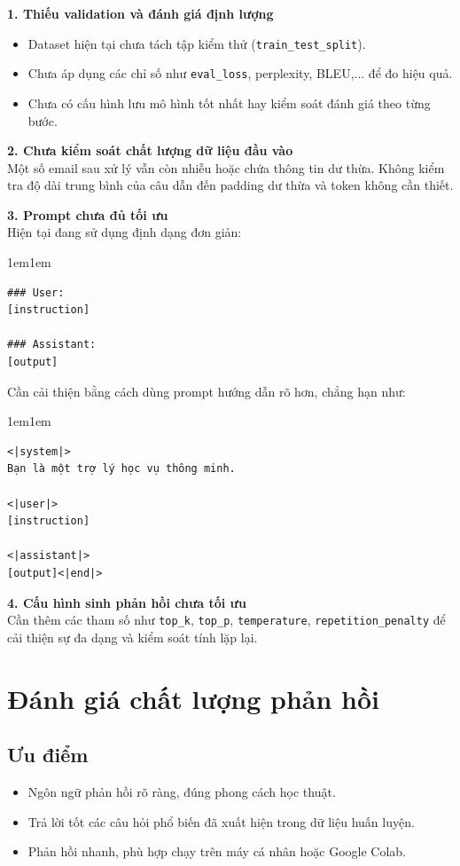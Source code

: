 \documentclass[../DoAn.tex]{subfiles}
\begin{document}
\textbf{1. Thiếu validation và đánh giá định lượng} \\ 
\begin{itemize}
    \item Dataset hiện tại chưa tách tập kiểm thử (\texttt{train\_test\_split}).
    \item Chưa áp dụng các chỉ số như \texttt{eval\_loss}, perplexity, BLEU,... để đo hiệu quả.
    \item Chưa có cấu hình lưu mô hình tốt nhất hay kiểm soát đánh giá theo từng bước.
\end{itemize}

\textbf{2. Chưa kiểm soát chất lượng dữ liệu đầu vào} \\ 
Một số email sau xử lý vẫn còn nhiễu hoặc chứa thông tin dư thừa. Không kiểm tra độ dài trung bình của câu dẫn đến padding dư thừa và token không cần thiết.

\textbf{3. Prompt chưa đủ tối ưu} \\ 
Hiện tại đang sử dụng định dạng đơn giản:
\begin{adjustwidth}{1em}{1em}
\begin{lstlisting}[language=none]
### User:
[instruction]

### Assistant:
[output]
\end{lstlisting}
\end{adjustwidth}
Cần cải thiện bằng cách dùng prompt hướng dẫn rõ hơn, chẳng hạn như:
\begin{adjustwidth}{1em}{1em}
\begin{lstlisting}[language=none]
<|system|>
Bạn là một trợ lý học vụ thông minh.

<|user|>
[instruction]

<|assistant|>
[output]<|end|>
\end{lstlisting}
\end{adjustwidth}

\textbf{4. Cấu hình sinh phản hồi chưa tối ưu} \\ 
Cần thêm các tham số như \texttt{top\_k}, \texttt{top\_p}, \texttt{temperature}, \texttt{repetition\_penalty} để cải thiện sự đa dạng và kiểm soát tính lặp lại.

\section{Đánh giá chất lượng phản hồi}

\subsection{Ưu điểm}
\begin{itemize}
    \item Ngôn ngữ phản hồi rõ ràng, đúng phong cách học thuật.
    \item Trả lời tốt các câu hỏi phổ biến đã xuất hiện trong dữ liệu huấn luyện.
    \item Phản hồi nhanh, phù hợp chạy trên máy cá nhân hoặc Google Colab.
\end{itemize}
\end{document}
